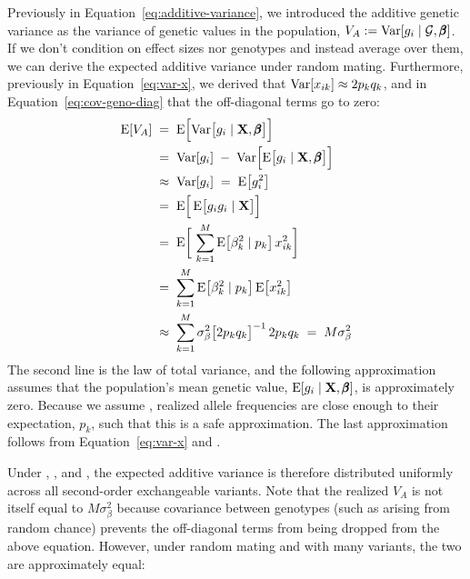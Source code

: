 \documentclass[12pt]{article}
\numberwithin{equation}{section}
\begin{document}
Previously in Equation~\eqref{eq:additive-variance}, we introduced the additive genetic variance as the variance of genetic values in the population, $V_A := \mathrm{Var}[g_i \mid \mathcal{G}, \pmb{\beta}]$. 
If we don't condition on effect sizes nor genotypes and instead average over them, we can derive the expected additive variance under random mating.
Furthermore, previously in Equation~\eqref{eq:var-x}, we derived that $\mathrm{Var}[x_{ik}] \approx 2p_k q_k$, and in Equation~\eqref{eq:cov-geno-diag} that the off-diagonal terms go to zero:
\begin{equation}\label{eq:additive-variance-effects}
\begin{aligned}
    \mathrm{E}[V_A]
    \;&=\; \mathrm{E}\Big[\mathrm{Var}\big[g_i \mid \mathbf{X}, \pmb{\beta}\big]\Big] \\
    \;&=\; \mathrm{Var}[g_i] \;-\; \mathrm{Var}\Big[\mathrm{E}\big[g_i \mid \mathbf{X}, \pmb{\beta}\big]\Big] \\
    \;&\approx\; \mathrm{Var}[g_i] \;=\; \mathrm{E}\big[g_i^2\big] \\
    \;&=\; \mathrm{E}\Big[\, \mathrm{E}\big[g_i g_i \mid \mathbf{X}\big] \Big] \\
    \;&=\; \mathrm{E}\bigg[\, \sum_{k=1}^{M} \mathrm{E}\big[\beta_k^2 \mid p_k\big]\, x_{ik}^2 \bigg] \\
    \;&=\; \sum_{k=1}^{M} \mathrm{E}\big[\beta_k^2 \mid p_k\big]\, \mathrm{E}\big[x_{ik}^2\big] \\
    \;&\approx\; \sum_{k=1}^{M} \sigma_\beta^2 \big[2p_k q_k\big]^{-1}\, 2p_k q_k \;=\; M \sigma_\beta^2
\end{aligned}
\end{equation}
The second line is the law of total variance, and the following approximation assumes that the population's mean genetic value, $\mathrm{E}[g_i \mid \mathbf{X}, \pmb{\beta}]$, is approximately zero.
Because we assume , realized allele frequencies are close enough to their expectation, $p_k$, such that this is a safe approximation.
The last approximation follows from Equation~\eqref{eq:var-x} and .

Under , , and , the expected additive variance is therefore distributed uniformly across all second-order exchangeable variants.
Note that the realized $V_A$ is not itself equal to $M\sigma_\beta^2$ because covariance between genotypes (such as arising from random chance) prevents the off-diagonal terms from being dropped from the above equation.
However, under random mating and with many variants, the two are approximately equal:
\end{document}
